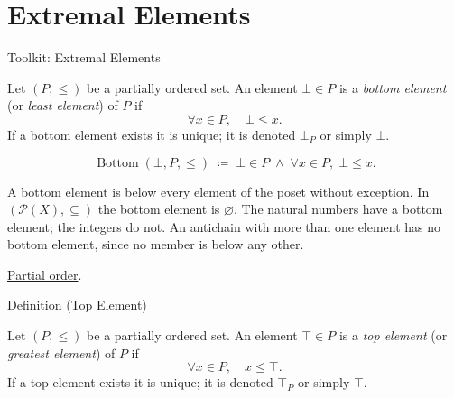 
\section{Extremal Elements}
\label{sec:extremal-elements}

\begin{definitionbox}{Toolkit: Extremal Elements}
\begin{definition}
\label{def:bottom-element}
Let $(P, \leq)$ be a partially ordered set.  An element $\bot \in P$ is
a \emph{bottom element} (or \emph{least element}) of $P$ if
\[
\forall x \in P, \quad \bot \leq x.
\]
If a bottom element exists it is unique; it is denoted $\bot_P$ or
simply $\bot$.
\end{definition}
\end{definitionbox}

\begin{remark*}
\[
\operatorname{Bottom}(\bot, P, \leq)
\;\coloneqq\;
\bot \in P \;\land\; \forall x \in P,\; \bot \leq x.
\]
\end{remark*}

\begin{remark*}[Interpretation]
A bottom element is below every element of the poset without exception.
In $(\mathcal{P}(X), \subseteq)$ the bottom element is $\varnothing$.
The natural numbers have a bottom element; the integers do not.
An antichain with more than one element has no bottom element, since no
member is below any other.
\end{remark*}

\begin{remark*}[Dependencies]
\hyperref[def:partial-order]{Partial order}.
\end{remark*}


\begin{definitionbox}{Definition (Top Element)}
\begin{definition}
\label{def:top-element}
Let $(P, \leq)$ be a partially ordered set.  An element $\top \in P$ is
a \emph{top element} (or \emph{greatest element}) of $P$ if
\[
\forall x \in P, \quad x \leq \top.
\]
If a top element exists it is unique; it is denoted $\top_P$ or simply
$\top$.
\end{definition}
\end{definitionbox}

